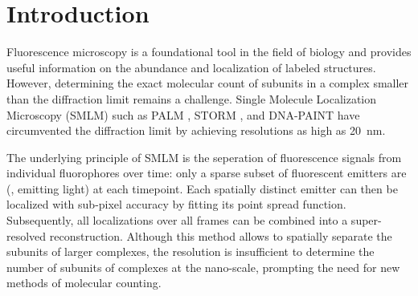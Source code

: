 \section{Introduction}

%
Fluorescence microscopy is a foundational tool in the field of biology and
provides useful information on the abundance and localization of labeled
structures.
%
  However, determining the exact molecular count of subunits in a complex smaller than the diffraction limit
  remains a challenge. Single Molecule Localization Microscopy (SMLM) such as PALM
  \cite{betzig_imaging_2006}, STORM \cite{rust_sub-diffraction-limit_2006}, and
  DNA-PAINT \cite{schnitzbauer_super-resolution_2017} have circumvented the diffraction limit
  by achieving resolutions as high as \SI{20}{\nm}.

%
The underlying principle of SMLM is the
seperation of fluorescence signals from individual fluorophores over time:
%
  only a sparse subset of fluorescent emitters are 
  (\ie, emitting light) at each timepoint.
  Each spatially distinct emitter can then be localized with sub-pixel accuracy
  by fitting its point spread function. Subsequently, all localizations over
  all frames can be combined into a super-resolved reconstruction.
  Although this method allows to spatially separate the subunits of larger complexes, the resolution is insufficient to determine the number of subunits of complexes at the nano-scale, prompting the need for new methods of molecular
  counting.

